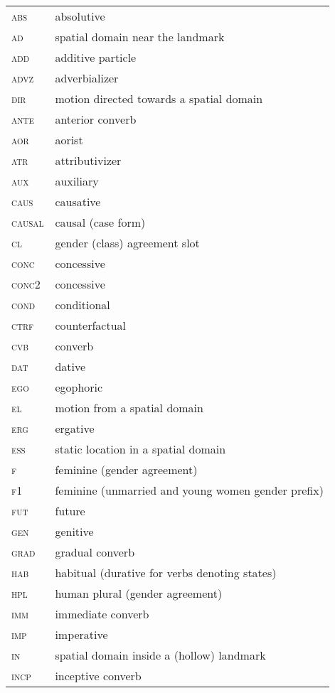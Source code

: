 ﻿\documentclass[output=paper]{langsci/langscibook}
\begin{document}
\begin{longtable}[l]{@{}ll@{}}
\textsc{abs}	& absolutive \\
\textsc{ad}	& spatial domain near the landmark \\
\textsc{add}	& additive particle \\
\textsc{advz}	& adverbializer \\
\textsc{dir}	& motion directed towards a spatial domain \\
\textsc{ante}	& anterior converb \\
\textsc{aor}	& aorist \\
\textsc{atr}	& attributivizer \\
\textsc{aux}	& auxiliary \\
\textsc{caus}	& causative \\
\textsc{causal}	& causal (case form) \\
\textsc{cl}	& gender (class) agreement slot \\
\textsc{conc}	& concessive \\
\textsc{conc2}	& concessive \\
\textsc{cond}	& conditional \\
\textsc{ctrf}	& counterfactual \\
\textsc{cvb}	& converb \\
\textsc{dat}	& dative \\
\textsc{ego}	& egophoric \\
\textsc{el}	& motion from a spatial domain \\
\textsc{erg}	& ergative \\
\textsc{ess}	& static location in a spatial domain \\
\textsc{f}	& feminine (gender agreement) \\
\textsc{f1}	& feminine (unmarried and young women gender prefix) \\
\textsc{fut}	& future \\
\textsc{gen}	& genitive \\
\textsc{grad}	& gradual converb \\
\textsc{hab}	& habitual (durative for verbs denoting states) \\
\textsc{hpl}	& human plural (gender agreement) \\
\textsc{imm}	& immediate converb \\
\textsc{imp}	& imperative \\
\textsc{in}	& spatial domain inside a (hollow) landmark \\
\textsc{incp}	& inceptive converb \\

\end{longtable}
\end{document}
